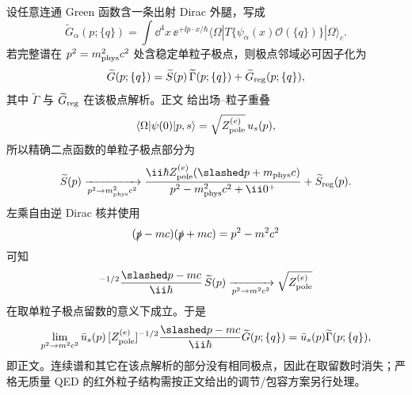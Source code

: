 \begin{derivation}

设任意连通 Green 函数含一条出射 Dirac 外腿，写成
\begin{equation*}
 \widetilde G_\alpha(p;\{q\})
 =\int\dd^4 x\,\ee^{+\ii p\cdot x/\hbar}
 \langle\Omega|T\{\psi_\alpha(x)\mathcal O(\{q\})\}|\Omega\rangle_c.
\end{equation*}
若完整谱在 $p^2=m_{\rm phys}^2c^2$ 处含稳定单粒子极点，则极点邻域必可因子化为
\begin{equation*}
 \widetilde G(p;\{q\})
 =\widetilde S(p)\,\widetilde\Gamma(p;\{q\})
 +\widetilde G_{\rm reg}(p;\{q\}),
\end{equation*}
其中 $\widetilde\Gamma$ 与 $\widetilde G_{\rm reg}$ 在该极点解析。正文 给出场--粒子重叠
\begin{equation*}
 \langle\Omega|\psi(0)|p,s\rangle=\sqrt{Z_{\rm pole}^{(e)}}\,u_s(p),
\end{equation*}
所以精确二点函数的单粒子极点部分为
\begin{equation*}
 \widetilde S(p)
 \xrightarrow[p^2\to m_{\rm phys}^2c^2]{}
 \frac{\ii\hbar Z_{\rm pole}^{(e)}(\slashed p+m_{\rm phys}c)}
 {p^2-m_{\rm phys}^2c^2+\ii0^+}
 +\widetilde S_{\rm reg}(p).
\end{equation*}
左乘自由逆 Dirac 核并使用
\begin{equation*}
 (\slashed p-mc)(\slashed p+mc)=p^2-m^2c^2
\end{equation*}
可知
\begin{equation*}
 [Z_{\rm pole}^{(e)}]^{-1/2}\frac{\slashed p-mc}{\ii\hbar}\,\widetilde S(p)
 \xrightarrow[p^2\to m^2c^2]{}\sqrt{Z_{\rm pole}^{(e)}}
\end{equation*}
在取单粒子极点留数的意义下成立。于是
\begin{equation*}
 \lim_{p^2\to m^2c^2}
 \bar u_s(p)\,
 [Z_{\rm pole}^{(e)}]^{-1/2}\frac{\slashed p-mc}{\ii\hbar}
 \widetilde G(p;\{q\})
 =\bar u_s(p)\widetilde\Gamma(p;\{q\}),
\end{equation*}
即正文。连续谱和其它在该点解析的部分没有相同极点，因此在取留数时消失；严格无质量 QED 的红外粒子结构需按正文给出的调节/包容方案另行处理。
\end{derivation}

